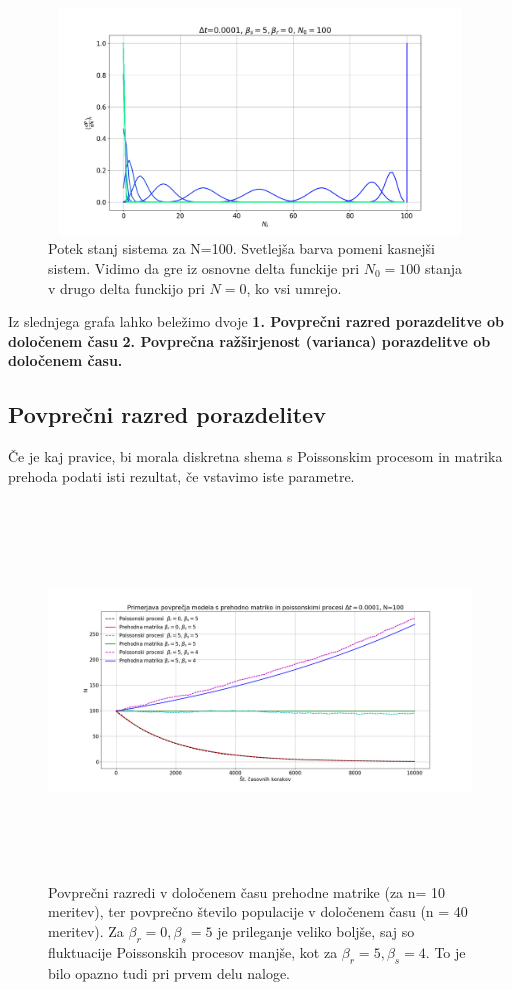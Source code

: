 \documentclass[11pt, a4paper]{article}
\begin{document}
 \begin{figure}[H]
\centering

  \includegraphics[width=16cm, height=6cm]{druga_1.png}
  \caption{Potek stanj sistema za N=100. Svetlejša barva pomeni kasnejši sistem. Vidimo da gre iz osnovne delta funckije pri $N_0 = 100$ stanja v drugo delta funckijo pri $N=0$, ko vsi umrejo.}

   
 \end{figure}
Iz slednjega grafa lahko beležimo dvoje \newline
\textbf{1. Povprečni razred porazdelitve ob določenem času}
\newline
\textbf{2. Povprečna ražširjenost (varianca) porazdelitve ob določenem času.}
\subsection{Povprečni razred porazdelitev}
Če je kaj pravice, bi morala diskretna shema s Poissonskim procesom in matrika prehoda podati isti rezultat, če vstavimo iste parametre.
\begin{figure}[H]
\centering

  \includegraphics[width=18cm, height=10cm]{druga_2.png}
  \caption{Povprečni razredi v določenem času prehodne matrike (za n= 10 meritev), ter povprečno število populacije v določenem času (n = 40 meritev). Za $\beta_r =0 ,\beta_s=5$ je prileganje veliko boljše, saj so fluktuacije Poissonskih procesov manjše, kot za $\beta_r =5,\beta_s=4$. To je bilo opazno tudi pri prvem delu naloge. }

   
 \end{figure}
\end{document}
